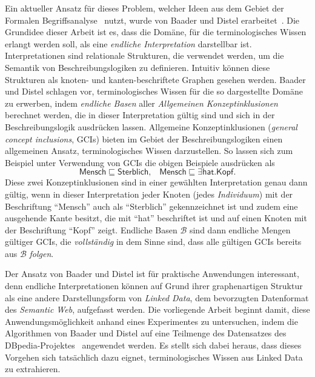 \documentclass[ngerman,fleqn,DIV=12]{scrartcl}
\begin{document}
Ein aktueller Ansatz für dieses Problem, welcher Ideen aus dem Gebiet der Formalen
Begriffsanalyse~\cite{fca-book} nutzt, wurde von Baader und Distel
erarbeitet~\cite{Diss-Felix}.  Die Grundidee dieser Arbeit ist es, dass die Domäne, für
die terminologisches Wissen erlangt werden soll, als eine \emph{endliche Interpretation}
darstellbar ist.  Interpretationen sind relationale Strukturen, die verwendet werden, um
die Semantik von Beschreibungslogiken zu definieren.  Intuitiv können diese Strukturen als
knoten- und kanten-beschriftete Graphen gesehen werden.  Baader und Distel schlagen vor,
terminologisches Wissen für die so dargestellte Domäne zu erwerben, indem \emph{endliche
  Basen} aller \emph{Allgemeinen Konzeptinklusionen} berechnet werden, die in dieser
Interpretation gültig sind und sich in der Beschreibungslogik \ELbot ausdrücken lassen.
Allgemeine Konzeptinklusionen (\emph{general concept inclusions}, GCIs) bieten im Gebiet
der Beschreibungslogiken einen allgemeinen Ansatz, terminologisches Wissen darzustellen.
So lassen sich zum Beispiel unter Verwendung von GCIs die obigen Beispiele ausdrücken als
\begin{equation*}
  \mathsf{Mensch} \sqsubseteq \mathsf{Sterblich}, \;\;\; \mathsf{Mensch} \sqsubseteq \exists
  \mathsf{hat}. \mathsf{Kopf}.
\end{equation*}
Diese zwei Konzeptinklusionen sind in einer gewählten Interpretation genau dann gültig,
wenn in dieser Interpretation jeder Knoten (jedes \emph{Individuum}) mit der Beschriftung
\enquote{\textsf{Mensch}} auch als \enquote{\textsf{Sterblich}} gekennzeichnet ist und
zudem eine ausgehende Kante besitzt, die mit \enquote{\textsf{hat}} beschriftet ist und
auf einen Knoten mit der Beschriftung \enquote{\textsf{Kopf}} zeigt.  Endliche Basen
$\mathcal{B}$ sind dann endliche Mengen gültiger GCIs, die \emph{vollständig} in dem Sinne
sind, dass alle gültigen GCIs bereits aus $\mathcal{B}$ \emph{folgen}.

Der Ansatz von Baader und Distel ist für praktische Anwendungen interessant, denn endliche
Interpretationen können auf Grund ihrer graphenartigen Struktur als eine andere
Darstellungsform von \emph{Linked Data}, dem bevorzugten Datenformat des \emph{Semantic
  Web}, aufgefasst werden.  Die vorliegende Arbeit beginnt damit, diese
Anwendungsmöglichkeit anhand eines Experimentes zu untersuchen, indem die Algorithmen von
Baader und Distel auf eine Teilmenge des Datensatzes des DBpedia-Projektes~\cite{DBpedia}
angewendet werden.  Es stellt sich dabei heraus, dass dieses Vorgehen sich tatsächlich
dazu eignet, terminologisches Wissen aus Linked Data zu extrahieren.
\end{document}
